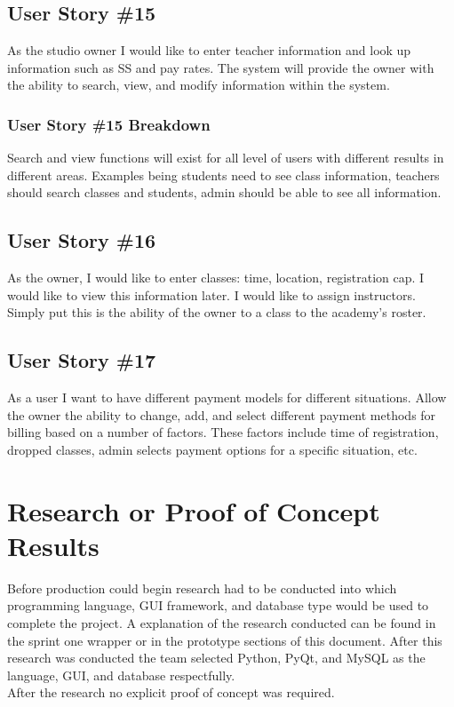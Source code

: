 \subsection{User Story \#15}
As the studio owner I would like to enter teacher information and look up information such as SS and pay rates. The system will provide the owner with the ability to search, view, and modify information within the system.

\subsubsection{User Story \#15 Breakdown}
Search and view functions will exist for all level of users with different results in different areas. Examples being students need to see class information, teachers should search classes and students, admin should be able to see all information.

\subsection{User Story \#16}
As the owner, I would like to enter classes: time, location, registration cap. I would like to view this information later. I would like to assign instructors. Simply put this is the ability of the owner to a class to the academy's roster. 

\subsection{User Story \#17}
As a user I want to have different payment models for different situations. Allow the owner the ability to change, add, and select different payment methods for billing based on a number of factors. These factors include time of registration, dropped classes, admin selects payment options for a specific situation, etc.


\section{Research or Proof of Concept Results}
Before production could begin research had to be conducted into which programming language, GUI framework, and database type would be used to complete the project. A explanation of the research conducted can be found in the sprint one wrapper or in the prototype sections of this document. After this research was conducted the team selected Python, PyQt, and MySQL as the language, GUI, and database respectfully.\\
After the research no explicit proof of concept was required.

